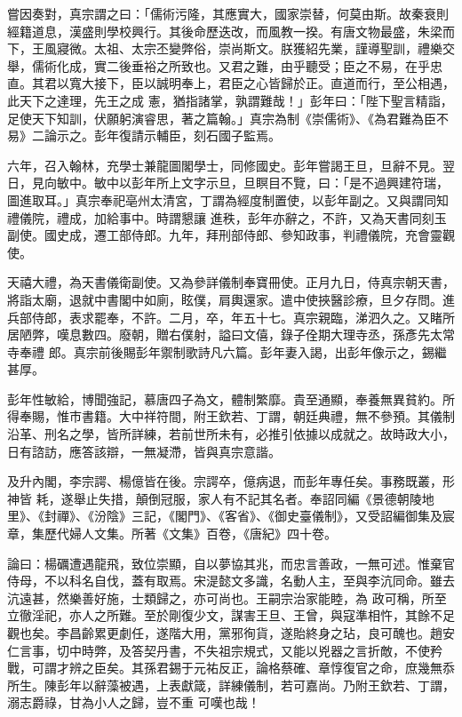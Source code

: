 \begin{pinyinscope}
 嘗因奏對，真宗謂之曰：「儒術污隆，其應實大，國家崇替，何莫由斯。故秦衰則經籍道息，漢盛則學校興行。其後命歷迭改，而風教一揆。有唐文物最盛，朱梁而下，王風寢微。太祖、太宗丕變弊俗，崇尚斯文。朕獲紹先業，謹導聖訓，禮樂交舉，儒術化成，實二後垂裕之所致也。又君之難，由乎聽受；臣之不易，在乎忠直。其君以寬大接下，臣以誠明奉上，君臣之心皆歸於正。直道而行，至公相遇，此天下之達理，先王之成
 憲，猶指諸掌，孰謂難哉！」彭年曰：「陛下聖言精詣，足使天下知訓，伏願躬演睿思，著之篇翰。」真宗為制《崇儒術》、《為君難為臣不易》二論示之。彭年復請示輔臣，刻石國子監焉。



 六年，召入翰林，充學士兼龍圖閣學士，同修國史。彭年嘗謁王旦，旦辭不見。翌日，見向敏中。敏中以彭年所上文字示旦，旦瞑目不覽，曰：「是不過興建符瑞，圖進取耳。」真宗奉祀亳州太清宮，丁謂為經度制置使，以彭年副之。又與謂同知禮儀院，禮成，加給事中。時謂懇讓
 進秩，彭年亦辭之，不許，又為天書同刻玉副使。國史成，遷工部侍郎。九年，拜刑部侍郎、參知政事，判禮儀院，充會靈觀使。



 天禧大禮，為天書儀衛副使。又為參詳儀制奉寶冊使。正月九日，侍真宗朝天書，將詣太廟，退就中書閣中如廁，眩僕，肩輿還家。遣中使挾醫診療，旦夕存問。進兵部侍郎，表求罷奉，不許。二月，卒，年五十七。真宗親臨，涕泗久之。又睹所居陋弊，嘆息數四。廢朝，贈右僕射，謚曰文僖，錄子佺期大理寺丞，孫彥先太常寺奉禮
 郎。真宗前後賜彭年禦制歌詩凡六篇。彭年妻入謁，出彭年像示之，錫繼甚厚。



 彭年性敏給，博聞強記，慕唐四子為文，體制繁靡。貴至通顯，奉養無異貧約。所得奉賜，惟市書籍。大中祥符間，附王欽若、丁謂，朝廷典禮，無不參預。其儀制沿革、刑名之學，皆所詳練，若前世所未有，必推引依據以成就之。故時政大小，日有諮訪，應答該辯，一無凝滯，皆與真宗意諧。



 及升內閣，李宗諤、楊億皆在後。宗諤卒，億病退，而彭年專任矣。事務既叢，形神皆
 耗，遂舉止失措，顛倒冠服，家人有不記其名者。奉詔同編《景德朝陵地里》、《封禪》、《汾陰》三記，《閣門》、《客省》、《御史臺儀制》，又受詔編御集及宸章，集歷代婦人文集。所著《文集》百卷，《唐紀》四十卷。



 論曰：楊礪遭遇龍飛，致位崇顯，自以夢協其兆，而忠言善政，一無可述。惟棄官侍母，不以科名自伐，蓋有取焉。宋湜懿文多識，名動人主，至與李沆同命。雖去沆遠甚，然樂善好施，士類歸之，亦可尚也。王嗣宗治家能睦，為
 政可稱，所至立徹淫祀，亦人之所難。至於剛復少文，謀害王旦、王曾，與寇準相忤，其餘不足觀也矣。李昌齡累更劇任，遂階大用，黨邪徇貨，遂貽終身之玷，良可醜也。趙安仁言事，切中時弊，及答契丹書，不失祖宗規式，又能以兇器之言折敵，不使矜戰，可謂才辨之臣矣。其孫君錫于元祐反正，論格蔡確、章惇復官之命，庶幾無忝所生。陳彭年以辭藻被遇，上表獻箴，詳練儀制，若可嘉尚。乃附王欽若、丁謂，溺志爵祿，甘為小人之歸，豈不重
 可嘆也哉！



\end{pinyinscope}